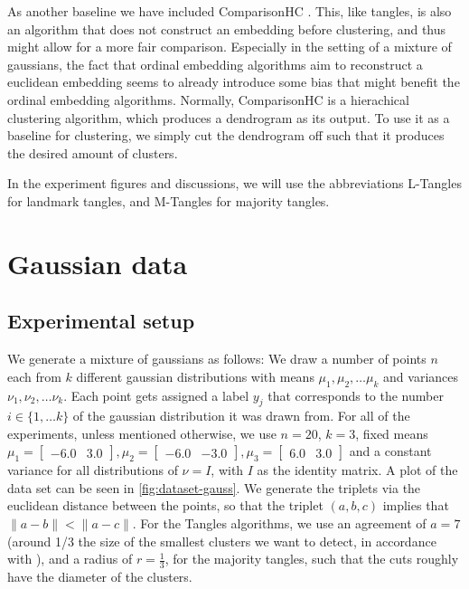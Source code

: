 As another baseline we have included ComparisonHC \citep{ghoshdastidarFoundationsComparisonBasedHierarchical2019}. This, like tangles, is also an algorithm that does not construct an embedding before clustering,
and thus might allow for a more fair comparison. Especially in the setting of a mixture of gaussians, 
the fact that ordinal embedding algorithms aim to reconstruct a euclidean embedding seems to already introduce some bias that might benefit the ordinal embedding algorithms.
Normally, ComparisonHC is a hierachical clustering algorithm, which produces a dendrogram as its output. To use it as a baseline for clustering, we simply
cut the dendrogram off such that it produces the desired amount of clusters.

In the experiment figures and discussions, we will  use the abbreviations L-Tangles for landmark tangles, and M-Tangles for majority tangles.

\section{Gaussian data}\label{sec:gaussian_data}
\subsection{Experimental setup}
We generate a mixture of gaussians as follows: We draw a number of points $n$ each from $k$ different gaussian distributions with means $\mu_1, \mu_2, \ldots \mu_k$ and 
variances $\nu_1, \nu_2, \ldots \nu_k$. Each point gets assigned a label $y_j$ that corresponds to the number $i \in \{1, \ldots k\}$ of the gaussian distribution it was drawn from.
For all of the experiments, unless mentioned otherwise, we use $n=20$, $k=3$, fixed means $\mu_1 = \begin{bmatrix} -6.0 & 3.0 \end{bmatrix}, 
\mu_2 = \begin{bmatrix} -6.0 & -3.0 \end{bmatrix},  \mu_3 = \begin{bmatrix} 6.0 & 3.0 \end{bmatrix}$ and a constant variance for all distributions of $\nu = I$, 
with $I$ as the identity matrix. A plot of the data set can be seen in \autoref{fig:dataset-gauss}. We generate the triplets via the euclidean distance between the points, so that
the triplet $(a,b,c)$ implies that $\|a - b\| < \|a - c\|$. For the Tangles algorithms, we use an agreement of $a=7$ (around 1/3 the size of the smallest
clusters we want to detect, in accordance with \cite{klepperClusteringTanglesAlgorithmic2021}), and a radius of $r=\frac{1}{3}$, for the majority
tangles, such that the cuts roughly have the diameter of the clusters.

